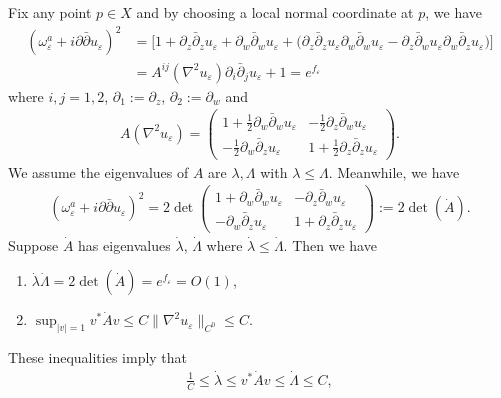 \documentclass[11pt]{amsart}
\theoremstyle{plain}
\theoremstyle{definition}
\numberwithin{equation}{section}
\renewcommand{\leq}{\leqslant}
\begin{document}
Fix any point $p\in X$ and by choosing a local normal coordinate at $p$, we have %
\begin{align}
(\omega^a_{\varepsilon}+i\partial\bar{\partial}u_{\varepsilon})^2&=\Big[1+\partial_z\bar{\partial}_zu_{\varepsilon}+\partial_w\bar{\partial}_wu_{\varepsilon}+\Big(\partial_z\bar{\partial}_zu_{\varepsilon}\partial_w\bar{\partial}_wu_{\varepsilon}-\partial_z\bar{\partial}_wu_{\varepsilon}\partial_w\bar{\partial}_zu_{\varepsilon} \Big)\Big]\\
&=A^{ij}(\nabla^2u_{\varepsilon})\partial_i\bar{\partial}_j u_{\varepsilon}+1=e^{f_{\varepsilon}}\nonumber
\end{align}
where $i,j=1,2$, $\partial_1:=\partial_z$, $\partial_2:=\partial_w$ and
\begin{align}
A(\nabla^2u_{\varepsilon})=
\left(
\begin{array}{cc}
1+\frac{1}{2}\partial_w\bar{\partial}_wu_{\varepsilon} & -\frac{1}{2}\partial_z\bar{\partial}_wu_{\varepsilon}\\
-\frac{1}{2}\partial_w\bar{\partial}_zu_{\varepsilon} & 1+\frac{1}{2}\partial_z\bar{\partial}_z u_{\varepsilon}
\end{array}
\right).
\end{align}
We assume the eigenvalues of $A$ are $\lambda,\Lambda$ with $\lambda\leq \Lambda$. Meanwhile, we have
\begin{align}
(\omega^a_{\varepsilon}+i\partial\bar{\partial}u_{\varepsilon})^2=2\det \left(
\begin{array}{cc}
1+\partial_w\bar{\partial}_{w}u_{\varepsilon}& -\partial_z\bar{\partial}_wu_{\varepsilon}\\
-\partial_w\bar{\partial}_zu_{\varepsilon} &1+\partial_z\bar{\partial}_{z}u_{\varepsilon}
\end{array}
\right)
:=2\det (\dot{A}).
\end{align}
Suppose $\dot{A}$ has eigenvalues $\dot{\lambda}$, $\dot{\Lambda}$ where $\dot{\lambda}\leq\dot{\Lambda}$. Then we have
\begin{enumerate}
\item $\dot{\lambda}\dot{\Lambda}=2\det(\dot{A})=e^{f_{\varepsilon}}=O(1)$,
\item $\sup_{|v|=1} v^*\dot{A}v\leq C\|\nabla^2u_{\varepsilon}\|_{C^0}\leq C$.
\end{enumerate}
These inequalities imply that
\begin{align}\label{ellp}
\frac{1}{C}\leq \dot{\lambda}\leq v^*\dot{A}v \leq \dot{\Lambda}\leq C,
\end{align}
\end{document}
